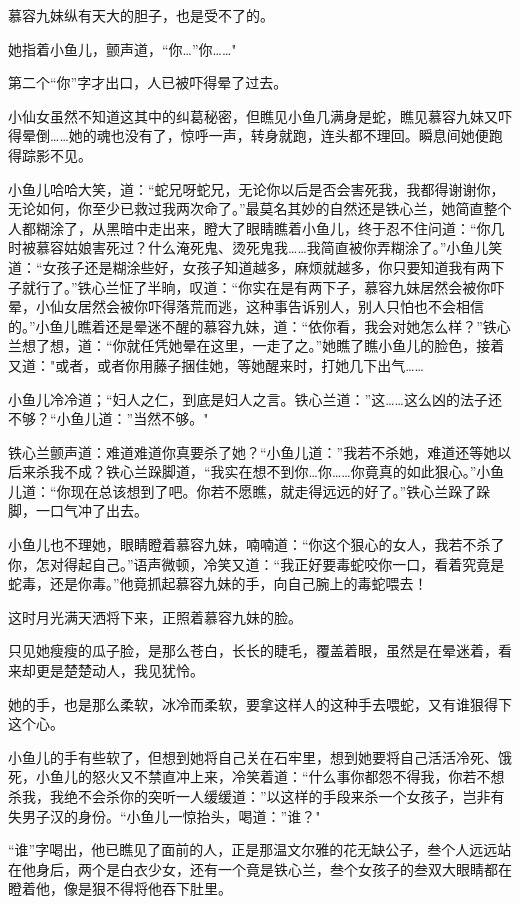 \documentclass[12pt,oneside]{book}
\begin{document}
慕容九妹纵有天大的胆子，也是受不了的。

她指着小鱼儿，颤声道，``你\ldots{}''你\ldots\ldots"

第二个``你''字才出口，人已被吓得晕了过去。

小仙女虽然不知道这其中的纠葛秘密，但瞧见小鱼几满身是蛇，瞧见慕容九妹又吓得晕倒\ldots\ldots 她的魂也没有了，惊呼一声，转身就跑，连头都不理回。瞬息间她便跑得踪影不见。

小鱼儿哈哈大笑，道：``蛇兄呀蛇兄，无论你以后是否会害死我，我都得谢谢你，无论如何，你至少已救过我两次命了。''最莫名其妙的自然还是铁心兰，她简直整个人都糊涂了，从黑暗中走出来，瞪大了眼睛瞧着小鱼儿，终于忍不住问道：``你几时被慕容姑娘害死过？什么淹死鬼、烫死鬼我\ldots\ldots 我简直被你弄糊涂了。''小鱼儿笑道：``女孩子还是糊涂些好，女孩子知道越多，麻烦就越多，你只要知道我有两下子就行了。''铁心兰怔了半晌，叹道：``你实在是有两下子，慕容九妹居然会被你吓晕，小仙女居然会被你吓得落荒而逃，这种事告诉别人，别人只怕也不会相信的。''小鱼儿瞧着还是晕迷不醒的慕容九妹，道：``依你看，我会对她怎么样？''铁心兰想了想，道：``你就任凭她晕在这里，一走了之。''她瞧了瞧小鱼儿的脸色，接着又道："或者，或者你用藤子捆佳她，等她醒来时，打她几下出气\ldots\ldots{}

小鱼儿冷冷道；``妇人之仁，到底是妇人之言。铁心兰道：''这\ldots\ldots 这么凶的法子还不够？``小鱼儿道：''当然不够。"

铁心兰颤声道：难道难道你真要杀了她？``小鱼儿道：''我若不杀她，难道还等她以后来杀我不成？铁心兰跺脚道，``我实在想不到你\ldots 你\ldots\ldots 你竟真的如此狠心。''小鱼儿道：``你现在总该想到了吧。你若不愿瞧，就走得远远的好了。''铁心兰跺了跺脚，一口气冲了出去。

小鱼儿也不理她，眼睛瞪着慕容九妹，喃喃道：``你这个狠心的女人，我若不杀了你，怎对得起自己。''语声微顿，冷笑又道：``我正好要毒蛇咬你一口，看着究竟是蛇毒，还是你毒。''他竟抓起慕容九妹的手，向自己腕上的毒蛇喂去！

这时月光满天洒将下来，正照着慕容九妹的脸。

只见她瘦瘦的瓜子脸，是那么苍白，长长的睫毛，覆盖着眼，虽然是在晕迷着，看来却更是楚楚动人，我见犹怜。

她的手，也是那么柔软，冰冷而柔软，要拿这样人的这种手去喂蛇，又有谁狠得下这个心。

小鱼儿的手有些软了，但想到她将自己关在石牢里，想到她要将自己活活冷死、饿死，小鱼儿的怒火又不禁直冲上来，冷笑着道：``什么事你都怨不得我，你若不想杀我，我绝不会杀你的突听一人缓缓道：''以这样的手段来杀一个女孩子，岂非有失男子汉的身份。``小鱼儿一惊抬头，喝道：''谁？"

``谁''字喝出，他已瞧见了面前的人，正是那温文尔雅的花无缺公子，叁个人远远站在他身后，两个是白衣少女，还有一个竟是铁心兰，叁个女孩子的叁双大眼睛都在瞪着他，像是狠不得将他吞下肚里。
\end{document}
